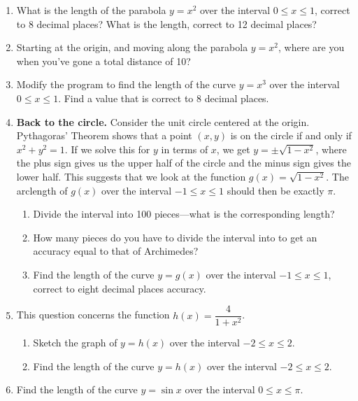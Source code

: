 \begin{enumerate}
\item What is the length of the parabola $y = x^2$ over the interval $0
 \leq x \leq 1$, correct to 8 decimal places?  What is the length,
 correct to 12 decimal places?


\item Starting at the origin, and moving along the parabola $y=x^2$,
 where are you when you've gone a total distance of 10?


\item Modify the program to find the length of the curve $y = x^3$ over
 the interval $0 \leq x \leq 1$.  Find a value that is correct to 8
 decimal places.


\item {\bf Back to the circle.}  Consider the unit circle centered at
 the origin.  Pythagoras' Theorem shows that a point $(x, y)$ is on
 the circle if and only if $x^2 + y^2 = 1$.  If we solve this for $y$
 in terms of $x$, we get $y=\pm \sqrt{1 - x^2}$, where the plus sign
 gives us the upper half of the circle and the minus sign gives the
 lower half. This suggests that we look at the function $g(x) =
 \sqrt{1 - x^2}$.  The arclength of $g(x)$ over the interval $-1 \leq
 x \leq 1$ should then be exactly $\pi$.

  \begin{enumerate}
  \item Divide the interval into 100 pieces---what is the corresponding
 length?

  \item How many pieces do you have to divide the interval into to get an
 accuracy equal to that of Archimedes?

  \item Find the length of the curve $y = g(x)$ over the interval $-1
 \leq x \leq 1$, correct to eight decimal places accuracy.


\end{enumerate}
\item This question concerns the function $h(x) = \dfrac{4}{1 + x^2}$.

  \begin{enumerate}
  \item Sketch the graph of $y = h(x)$ over the interval $-2 \leq x \leq
 2$.

  \item Find the length of the curve $y = h(x)$ over the interval $-2
 \leq x \leq 2$.


\end{enumerate}
\item Find the length of the curve $y=\sin x$ over the interval $0 \leq
 x \leq \pi$.


\end{enumerate}

